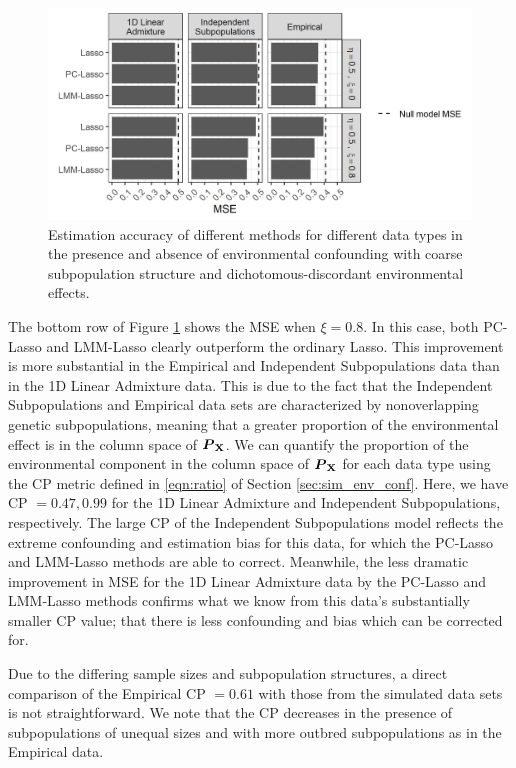 \begin{figure}[H]
    \centering
    \includegraphics[scale = 1.1]{figures/beta_mse.png}
    \caption{Estimation accuracy of different methods for different data types in the presence and absence of environmental confounding with coarse subpopulation structure and dichotomous-discordant environmental effects.}
    \label{fig:mse}
\end{figure}

The bottom row of Figure \ref{fig:mse} shows the MSE when $\xi = 0.8$. In this case, both PC-Lasso and LMM-Lasso clearly outperform the ordinary Lasso. This improvement is more substantial in the Empirical and Independent Subpopulations data than in the 1D Linear Admixture data. This is due to the fact that the Independent Subpopulations and Empirical data sets are characterized by nonoverlapping genetic subpopulations, meaning that a greater proportion of the environmental effect is in the column space of $\boldsymbol{P}_{\textbf{X}}$. We can quantify the proportion of the environmental component in the column space of $\boldsymbol{P}_{\textbf{X}}$ for each data type using the CP metric defined in \eqref{eqn:ratio} of Section \ref{sec:sim_env_conf}. Here, we have CP $= 0.47, 0.99$ for the 1D Linear Admixture and Independent Subpopulations, respectively. The large CP of the Independent Subpopulations model reflects the extreme confounding and estimation bias for this data, for which the PC-Lasso and LMM-Lasso methods are able to correct. Meanwhile, the less dramatic improvement in MSE for the 1D Linear Admixture data by the PC-Lasso and LMM-Lasso methods confirms what we know from this data's substantially smaller CP value; that there is less confounding and bias which can be corrected for. 

Due to the differing sample sizes and subpopulation structures, a direct comparison of the Empirical CP $= 0.61$ with those from the simulated data sets is not straightforward. We note that the CP decreases in the presence of subpopulations of unequal sizes and with more outbred subpopulations as in the Empirical data. 

